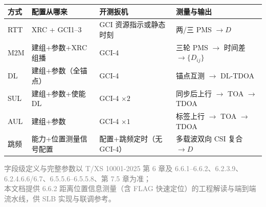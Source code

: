 \documentclass[11pt,a4paper]{ctexart}
\begin{document}
\begin{table}[h]
\centering
\small
\begin{tabular}{L{1.6cm}L{2.8cm}L{3.5cm}L{5cm}}
\toprule
\textbf{方式} & \textbf{配置从哪来} & \textbf{开测扳机} & \textbf{测量与输出} \\
\midrule
RTT & XRC + GCI1--3 & GCI 资源指示或静态时刻 & 两/三 PMS $\rightarrow D$ \\
M2M & 建组+参数+XRC 组播 & GCI-4 & 三轮 PMS $\rightarrow$ 时间差 $\rightarrow\{D_{ij}\}$ \\
DL & 建组+参数（全锚点） & GCI-4 & 锚点互测 $\rightarrow$ DL-TDOA \\
SUL & 建组+参数+使能 DL & GCI-4 $\times 2$ & 同步后上行 $\rightarrow$ TOA $\rightarrow$ TDOA \\
AUL & 建组+参数 & GCI-4 $\times 1$ & 标签上行 $\rightarrow$ TOA $\rightarrow$ TDOA \\
跳频 & 能力+位置测量信号配置 & 配置+跳频定时（无 GCI-4） & 多载波双向 CSI 复合 $\rightarrow D$ \\
\bottomrule
\end{tabular}
\end{table}

\vfill
\begin{center}
\small\textcolor{gray}{%
字段级定义与完整参数以 T/XS 10001-2025 第 6 章及 6.6.1--6.6.2、6.2.3.9、6.2.4.6.6/6.7、6.5.5.6--6.5.5.8、第 7.5 章为准；\\
本文档提供 6.6.2 距离位置信息测量（含 FLAG 快速定位）的工程解读与端到端流水线，供 SLB 实现与联调参考。%
}
\end{center}
\end{document}

